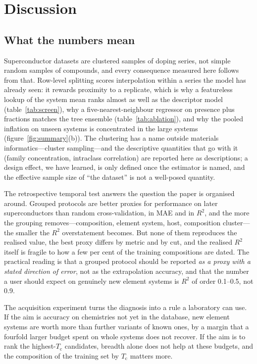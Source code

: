 \documentclass{iopjournal}
\newcommand{\Tc}{T_{\mathrm c}}
\newcommand{\Rsq}{R^{2}}
\begin{document}
\section{Discussion}

\subsection{What the numbers mean}

Superconductor datasets are clustered samples of doping series, not simple random samples of
compounds, and every consequence measured here follows from that. Row-level splitting scores
interpolation within a series the model has already seen: it rewards proximity to a replicate, which
is why a featureless lookup of the system mean ranks almost as well as the descriptor model
(table~\ref{tab:screen}), why a five-nearest-neighbour regressor on presence plus fractions matches
the tree ensemble (table~\ref{tab:ablation}), and why the pooled inflation on unseen systems is
concentrated in the large systems (figure~\ref{fig:summary}(b)). The clustering has a name outside
materials informatics---cluster sampling---and the descriptive quantities that go with it (family
concentration, intraclass correlation) are reported here as descriptions; a design effect, we have
learned, is only defined once the estimator is named, and the effective sample size of ``the
dataset'' is not a well-posed quantity.

The retrospective temporal test answers the question the paper is organised around. Grouped protocols are
better proxies for performance on later superconductors than random cross-validation, in MAE and in
$\Rsq$, and the more the grouping removes---composition, element system, host, composition
cluster---the smaller the $\Rsq$ overstatement becomes. But none of them reproduces the realised
value, the best proxy differs by metric and by cut, and the realised $\Rsq$ itself is fragile to how
a few per cent of the training compositions are dated. The practical reading is that a grouped
protocol should be reported \emph{as a proxy with a stated direction of error}, not as the
extrapolation accuracy, and that the number a user should expect on genuinely new element systems is
$\Rsq$ of order \numrange{0.1}{0.5}, not \num{0.9}.

The acquisition experiment turns the diagnosis into a rule a laboratory can use. If the aim is accuracy on chemistries not yet in the database, new element systems are worth more than further variants of known ones, by a margin that a fourfold larger budget spent on whole systems does not recover. If the aim is to rank the highest-$\Tc$ candidates, breadth alone does not help at these budgets, and the composition of the training set by $\Tc$ matters more.
\end{document}
